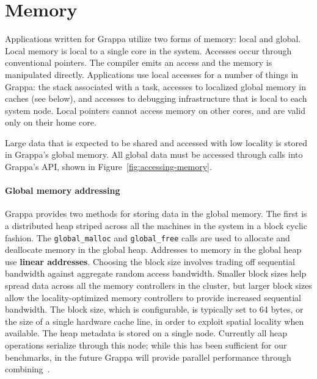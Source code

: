 \section{Memory}

Applications written for Grappa utilize two forms of memory: local and
global.  Local memory is local to a single core in the system.  Accesses occur
through conventional pointers.  The compiler emits an access and the
memory is manipulated directly.  Applications use local accesses for a
number of things in Grappa: the stack associated with a task, accesses
to localized global memory in caches (see below), and accesses to
debugging infrastructure that is local to each system node.  Local
pointers cannot access memory on other cores, and are valid only on
their home core.

Large data that is expected to be shared and accessed with low locality is
stored in Grappa's global memory. All global data must be accessed through
calls into Grappa's API, shown in Figure~\ref{fig:accessing-memory}.

\paragraph{Global memory addressing} Grappa provides two methods for
storing data in the global memory. The first is a distributed heap
striped across all the machines in the system in a block cyclic fashion.
The \texttt{global\_malloc} and \texttt{global\_free} calls are used to
allocate and deallocate memory in the global heap.  Addresses to memory
in the global heap use \textbf{linear addresses}.  Choosing the block
size involves trading off sequential bandwidth against aggregate random
access bandwidth. Smaller block sizes help spread data across all the
memory controllers in the cluster, but larger block sizes allow the
locality-optimized memory controllers to provide increased sequential
bandwidth. The block size, which is configurable, is typically set to 64
bytes, or the size of a single hardware cache line, in order to exploit
spatial locality when available. The heap metadata is stored on a single
node. Currently all heap operations serialize through this node; while
this has been sufficient for our benchmarks, in the future Grappa will
provide parallel performance through combining~\cite{MAMA,flatcombining}.

